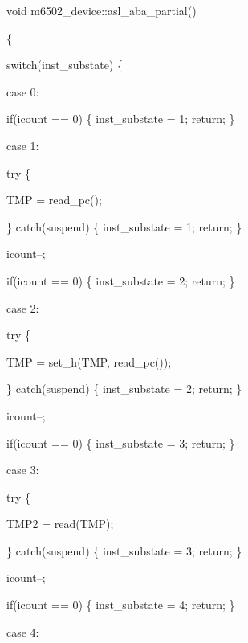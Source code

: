 \documentclass[letterpaper,10pt,brazil]{sphinxmanual}
\begin{document}
\begin{DUlineblock}{0em}
\item[] void m6502\_device::asl\_aba\_partial()
\item[] \{
\item[] switch(inst\_substate) \{
\item[] case 0:
\item[]
\begin{DUlineblock}{\DUlineblockindent}
\item[] if(icount == 0) \{ inst\_substate = 1; return; \}
\end{DUlineblock}
\item[] case 1:
\item[]
\begin{DUlineblock}{\DUlineblockindent}
\item[] try \{
\item[] TMP = read\_pc();
\item[] \} catch(suspend) \{ inst\_substate = 1; return; \}
\item[] icount--;
\item[] if(icount == 0) \{ inst\_substate = 2; return; \}
\end{DUlineblock}
\item[] case 2:
\item[]
\begin{DUlineblock}{\DUlineblockindent}
\item[] try \{
\item[] TMP = set\_h(TMP, read\_pc());
\item[] \} catch(suspend) \{ inst\_substate = 2; return; \}
\item[] icount--;
\item[] if(icount == 0) \{ inst\_substate = 3; return; \}
\end{DUlineblock}
\item[] case 3:
\item[]
\begin{DUlineblock}{\DUlineblockindent}
\item[] try \{
\item[] TMP2 = read(TMP);
\item[] \} catch(suspend) \{ inst\_substate = 3; return; \}
\item[] icount--;
\item[] if(icount == 0) \{ inst\_substate = 4; return; \}
\end{DUlineblock}
\item[] case 4:
\item[]
\begin{DUlineblock}{\DUlineblockindent}

\end{DUlineblock}
\end{DUlineblock}
\end{document}
